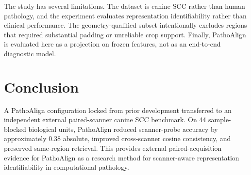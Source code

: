 \documentclass[11pt]{article}
\begin{document}
The study has several limitations. The dataset is canine SCC rather than human pathology, and the experiment evaluates representation identifiability rather than clinical performance. The geometry-qualified subset intentionally excludes regions that required substantial padding or unreliable crop support. Finally, PathoAlign is evaluated here as a projection on frozen features, not as an end-to-end diagnostic model.

\section{Conclusion}

A PathoAlign configuration locked from prior development transferred to an independent external paired-scanner canine SCC benchmark. On 44 sample-blocked biological units, PathoAlign reduced scanner-probe accuracy by approximately 0.38 absolute, improved cross-scanner cosine consistency, and preserved same-region retrieval. This provides external paired-acquisition evidence for PathoAlign as a research method for scanner-aware representation identifiability in computational pathology.



\end{document}
